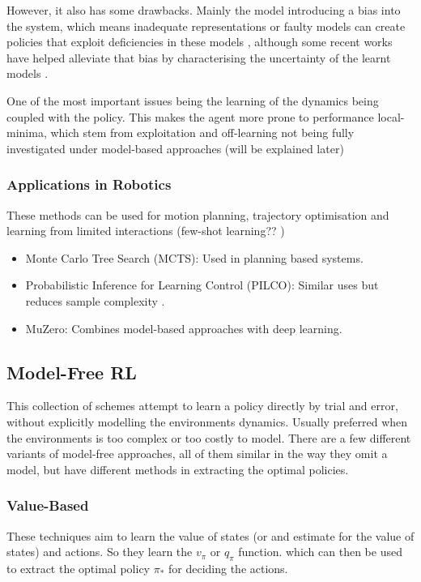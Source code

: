   However, it also has some drawbacks. Mainly the model introducing a bias into the system, which means inadequate representations or faulty models can create policies that exploit deficiencies in these models \cite{Deisenroth2011PILCO,wang2019benchmarkingmodelbasedreinforcementlearning}, although some recent works have helped alleviate that bias by characterising the uncertainty of the learnt models \cite{kurutach2018modelensembletrustregionpolicyoptimization,chua2018deepreinforcementlearninghandful,clavera2018modelbasedreinforcementlearningmetapolicy}.

  One of the most important issues being the learning of the dynamics being coupled with the policy. This makes the agent more prone to performance local-minima, which stem from exploitation and off-learning not being fully investigated under model-based approaches (will be explained later) 

  \subsubsection{Applications in Robotics}
  These methods can be used for motion planning, trajectory optimisation and learning from limited interactions (few-shot learning?? )
    \begin{itemize}
      \item Monte Carlo Tree Search (MCTS): Used in planning based systems.
      \item Probabilistic Inference for Learning Control (PILCO): Similar uses but reduces sample complexity \cite{Deisenroth2011PILCO}.
      \item MuZero: Combines model-based approaches with deep learning. 
    \end{itemize}
  
  
  \subsection{Model-Free RL}
  This collection of schemes attempt to learn a policy directly by trial and error, without explicitly modelling the environments dynamics. Usually preferred when the environments is too complex or too costly to model.
  There are a few different variants of model-free approaches, all of them similar in the way they omit a model, but have different methods in extracting the optimal policies.
  

  \subsubsection{Value-Based}
    These techniques aim to learn the value of states (or and estimate for the value of states) and actions. So they learn the $v_\pi$ or $q_\pi$ function. which can then be used to extract the optimal policy $\pi_*$ for deciding the actions.

